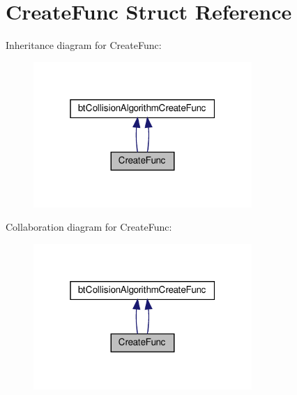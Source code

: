 \hypertarget{structCreateFunc}{}\section{Create\+Func Struct Reference}
\label{structCreateFunc}


Inheritance diagram for Create\+Func\+:
\nopagebreak
\begin{figure}[H]
\begin{center}
\leavevmode
\includegraphics[width=235pt]{structCreateFunc__inherit__graph}
\end{center}
\end{figure}


Collaboration diagram for Create\+Func\+:
\nopagebreak
\begin{figure}[H]
\begin{center}
\leavevmode
\includegraphics[width=235pt]{structCreateFunc__coll__graph}
\end{center}
\end{figure}
